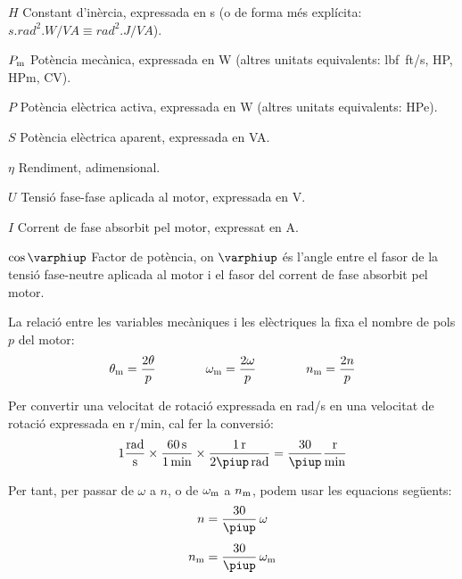 \begin{list}{}
   \item[$H$] Constant d'inèrcia, expressada en \unit{s} (o de forma més explícita:
   $\unit{s.rad^2.W/VA} \equiv \unit{rad^2.J/VA}$).
   \item[$P_\mathrm{m}$] Potència mecànica, expressada en \unit{W} (altres unitats equivalents: \unit{lbf.ft/s}, \unit{HP},  \unit{HPm}, \unit{CV}).
   \item[$P$] Potència elèctrica activa, expressada en \unit{W} (altres unitats equivalents: \unit{HPe}).
   \item[$S$] Potència elèctrica aparent, expressada en \unit{VA}.
   \item[$\eta$] Rendiment, adimensional.
   \item[$U$] Tensió fase-fase aplicada al motor, expressada en \unit{V}.
   \item[$I$] Corrent de fase absorbit pel motor, expressat en \unit{A}.
   \item[$\cos\varphiup$] Factor de potència, on $\varphiup$ és l'angle entre el fasor de la tensió fase-neutre aplicada al motor i el fasor del corrent de fase absorbit pel motor.
\end{list}

La relació entre les variables mecàniques i les elèctriques la fixa el nombre de pols $p$ del motor:
\begin{equation}\label{eq:vel-ele-mec}
    \theta_\mathrm{m} = \frac{2\theta}{p} \qquad\qquad
    \omega_\mathrm{m} = \frac{2\omega}{p} \qquad\qquad
    n_\mathrm{m} = \frac{2n}{p}
\end{equation}

Per  convertir una velocitat de rotació expressada en \unit{rad/s} en una velocitat de rotació expressada en \unit{r/min}, cal fer la conversió:
\begin{equation}
 1\frac{\unit{rad}}{\unit{s}} \times \frac{\qty{60}{s}}{\qty{1}{min}} \times \frac{\qty{1}{r}}{2\piup\,\unit{rad}} = \frac{30}{\piup}\frac{\unit{r}}{\unit{min}}
 \end{equation}

 Per tant, per passar de $\omega$ a $n$, o de $\omega_\mathrm{m}$ a $n_\mathrm{m}$, podem usar les equacions següents:
\begin{subequations}\index{motors d'inducció!velocitat}
\begin{align}
    n        &= \frac{30}{\piup} \,\omega \\[1ex]
    n\ped{m} &= \frac{30}{\piup} \,\omega\ped{m}
\end{align}
\end{subequations}

